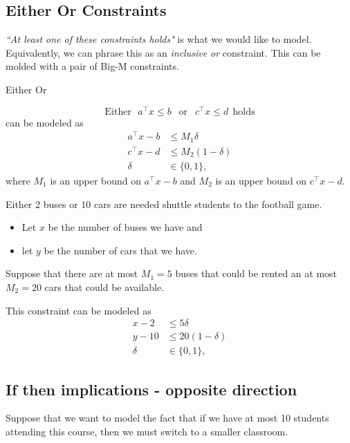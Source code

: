 \subsection{Either Or Constraints}
\emph{``At least one of these constraints holds"} is what we would like to model.  Equivalently, we can phrase this as an \emph{inclusive or} constraint.  This can be molded with a pair of Big-M constraints.
\begin{general}{Either Or}{}{}

\begin{equation}
\text{Either} \ \ \ a^\top x \leq b\ \  \text{  or  } \ \  c^\top x \leq d \ \ \text{holds} 
\end{equation}
can be modeled as 
\begin{equation}
\begin{split}
a^\top x - b &\leq M_1 \delta\\
c^\top x - d &\leq M_2 (1-\delta)\\
\delta &\in \{0,1\},
\end{split}
\end{equation}
where $M_1$ is an upper bound on $a^\top x - b$ and $M_2$ is an upper bound on $c^\top x - d$.
\end{general}

\begin{example}{}{}
Either $2$ buses or $10$ cars are needed shuttle students to the football game.  
\begin{itemize}
\item Let $x$ be the number of buses we have and 
\item let $y$ be the number of cars that we have.  
\end{itemize}
Suppose that there are at most $M_1 = 5$ buses that could be rented an at most $M_2 = 20$ cars that could be available.

This constraint can be modeled as 
\begin{equation}
\begin{split}
x - 2 &\leq 5\delta\\
y - 10 &\leq 20 (1-\delta)\\
\delta &\in \{0,1\},
\end{split}
\end{equation}
\end{example}
\subsection{If then implications - opposite direction}
Suppose that we want to model the fact that if we have at most 10 students attending this course, then we must switch to a smaller classroom.   

